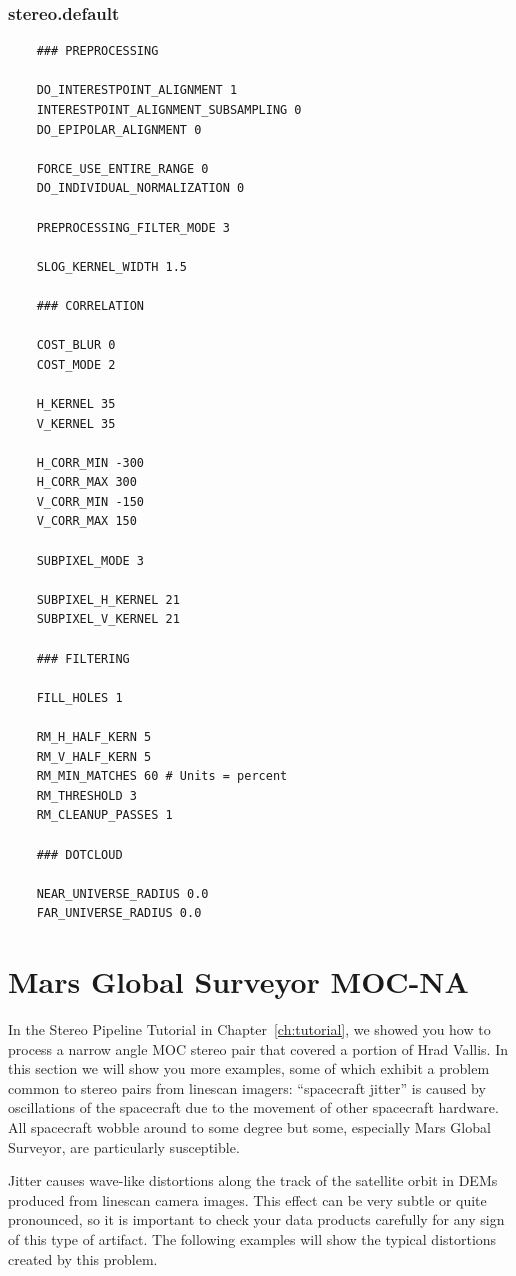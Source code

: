 \subsubsection*{stereo.default}

\begin{verbatim}
    ### PREPROCESSING

    DO_INTERESTPOINT_ALIGNMENT 1
    INTERESTPOINT_ALIGNMENT_SUBSAMPLING 0
    DO_EPIPOLAR_ALIGNMENT 0

    FORCE_USE_ENTIRE_RANGE 0
    DO_INDIVIDUAL_NORMALIZATION 0

    PREPROCESSING_FILTER_MODE 3

    SLOG_KERNEL_WIDTH 1.5

    ### CORRELATION

    COST_BLUR 0
    COST_MODE 2

    H_KERNEL 35
    V_KERNEL 35

    H_CORR_MIN -300
    H_CORR_MAX 300
    V_CORR_MIN -150
    V_CORR_MAX 150

    SUBPIXEL_MODE 3

    SUBPIXEL_H_KERNEL 21
    SUBPIXEL_V_KERNEL 21

    ### FILTERING

    FILL_HOLES 1

    RM_H_HALF_KERN 5
    RM_V_HALF_KERN 5
    RM_MIN_MATCHES 60 # Units = percent
    RM_THRESHOLD 3
    RM_CLEANUP_PASSES 1

    ### DOTCLOUD

    NEAR_UNIVERSE_RADIUS 0.0
    FAR_UNIVERSE_RADIUS 0.0
\end{verbatim}

\section{Mars Global Surveyor MOC-NA}

In the Stereo Pipeline Tutorial in Chapter~\ref{ch:tutorial}, we
showed you how to process a narrow angle \ac{MOC} stereo pair that
covered a portion of Hrad Vallis. In this section we will show you
more examples, some of which exhibit a problem common to stereo
pairs from linescan imagers: ``spacecraft jitter'' is caused by
oscillations of the spacecraft due to the movement of other spacecraft
hardware.  All spacecraft wobble around to some degree but some,
especially Mars Global Surveyor, are particularly susceptible.

Jitter causes wave-like distortions along the track of the satellite
orbit in \acp{DEM} produced from linescan camera images.  This effect can
be very subtle or quite pronounced, so it is important to check your
data products carefully for any sign of this type of artifact. The
following examples will show the typical distortions created by this
problem.

